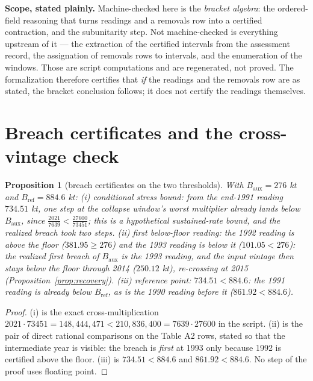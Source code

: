 \documentclass[10pt,twocolumn]{article}
\theoremstyle{plain}
\newtheorem{proposition}[theorem]{Proposition}
\theoremstyle{remark}
\begin{document}
\noindent\textbf{Scope, stated plainly.} Machine-checked here is the \emph{bracket algebra}:
the ordered-field reasoning that turns readings and a removals row into a certified
contraction, and the subunitarity step. Not machine-checked is everything upstream of it ---
the extraction of the certified intervals from the assessment record, the assignation of
removals rows to intervals, and the enumeration of the windows. Those are script computations
and are regenerated, not proved. The formalization therefore certifies that \emph{if} the
readings and the removals row are as stated, the bracket conclusion follows; it does not
certify the readings themselves.

\section{Breach certificates and the cross-vintage check}\label{breach}

\begin{proposition}[breach certificates on the two thresholds]
\label{prop:breach}
With \(B_{\mathrm{aux}} = 276\) kt and \(B_{\mathrm{ref}} = 884.6\)
kt: (i) \emph{conditional stress bound}: from the end-1991 reading
\(734.51\) kt, one step at the collapse window's worst multiplier
already lands below \(B_{\mathrm{aux}}\), since
\(\tfrac{2021}{7639} < \tfrac{27600}{73451}\); this is a hypothetical
sustained-rate bound, and the realized breach took two steps.
(ii) \emph{first below-floor reading}: the 1992 reading is above the
floor (\(381.95 \ge 276\)) and the 1993 reading is below it
(\(101.05 < 276\)): the realized first breach of \(B_{\mathrm{aux}}\)
is the 1993 reading, and the input vintage then stays below the floor
through 2014 (\(250.12\) kt), re-crossing at 2015
(Proposition~\ref{prop:recovery}). (iii) \emph{reference point}:
\(734.51 < 884.6\): the 1991 reading is already below
\(B_{\mathrm{ref}}\), as is the 1990 reading before it
(\(861.92 < 884.6\)).
\end{proposition}

\begin{proof}
(i) is the exact cross-multiplication
\(2021 \cdot 73451 = 148{,}444{,}471 < 210{,}836{,}400 = 7639 \cdot
27600\) in the script. (ii) is the pair of direct rational comparisons
on the Table A2 rows, stated so that the intermediate year is visible:
the breach is \emph{first} at 1993 only because 1992 is certified
above the floor. (iii) is \(734.51 < 884.6\) and \(861.92 < 884.6\).
No step of the proof uses floating point.
\end{proof}
\end{document}
